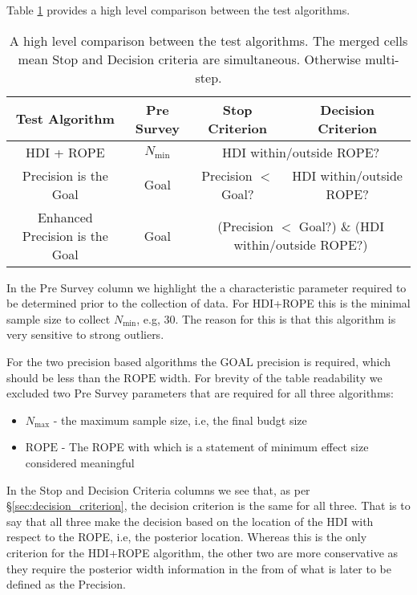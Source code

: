Table \ref{tab:table1} provides a high level comparison between the test algorithms.

\begin{table}[h!]\label{tab:table1}
    \begin{center}
      \begin{tabular}{c|c|c|c}
        \textbf{Test Algorithm } & \textbf{Pre Survey} & \textbf{Stop Criterion} &  \textbf{Decision Criterion}\\
        \hline
        HDI + ROPE & $N_\mathrm{min}$  & \multicolumn{2}{c}{\multirow{1}{*}{HDI within/outside ROPE?}}  \\
        Precision is the Goal & Goal & Precision $<$ Goal? & HDI within/outside ROPE? \\
        Enhanced Precision is the Goal & Goal& \multicolumn{2}{c}{\multirow{1}{*}{(Precision $<$ Goal?) \& (HDI within/outside ROPE?)}}  \\
      \end{tabular}
      \caption{A high level comparison between the test algorithms.
      The merged cells mean Stop and Decision criteria are simultaneous.
      Otherwise multi-step.
      }
    \end{center}
  \end{table}

In the Pre Survey column we highlight the a characteristic parameter required to be
determined prior to the collection of data. For HDI+ROPE this is the minimal sample size
to collect $N_\mathrm{min}$, e.g, 30. The reason for this is that this algorithm
is very sensitive to strong outliers.

For the two precision based algorithms the $\mathrm{GOAL}$ precision is required,
which should be less than the $\mathrm{ROPE}$ width. For brevity of the table
readability we excluded two Pre Survey parameters that are required for all three
algorithms:
\begin{itemize}
    \item $N_\mathrm{max}$ - the maximum sample size, i.e, the final budgt size
    \item $\mathrm{ROPE}$ - The ROPE with which is a statement of minimum effect size considered meaningful
\end{itemize}

In the Stop and Decision Criteria columns we see that,
as per \S\ref{sec:decision_criterion}, the decision criterion is the same
for all three. That is to say that all three make the decision based on the
location of the HDI with respect to the ROPE, i.e, the posterior location.
Whereas this is the only criterion for the HDI+ROPE algorithm, the other two
are more conservative as they require the posterior width information in the from
of what is later to be defined as the Precision.


